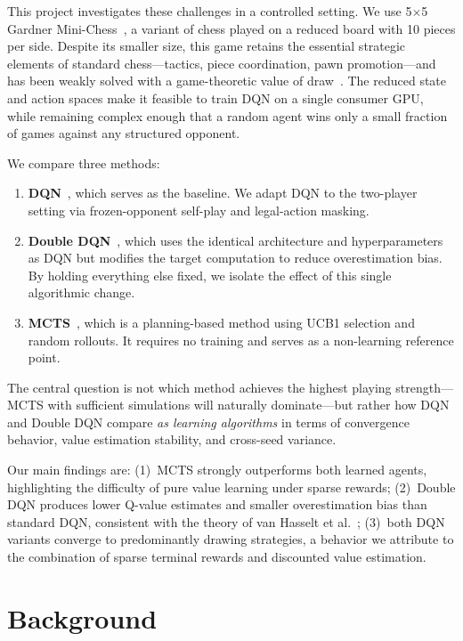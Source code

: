 \documentclass[letterpaper]{article}
\begin{document}
This project investigates these challenges in a controlled setting.
We use 5$\times$5 Gardner Mini-Chess~\cite{gardner1970}, a variant of chess played on a reduced board with 10 pieces per side.
Despite its smaller size, this game retains the essential strategic elements of standard chess---tactics, piece coordination, pawn promotion---and has been weakly solved with a game-theoretic value of draw~\cite{ehsan2012}.
The reduced state and action spaces make it feasible to train DQN on a single consumer GPU, while remaining complex enough that a random agent wins only a small fraction of games against any structured opponent.

We compare three methods:
\begin{enumerate}
    \item \textbf{DQN}~\cite{mnih2015human}, which serves as the baseline. We adapt DQN to the two-player setting via frozen-opponent self-play and legal-action masking.
    \item \textbf{Double DQN}~\cite{van2016deep}, which uses the identical architecture and hyperparameters as DQN but modifies the target computation to reduce overestimation bias. By holding everything else fixed, we isolate the effect of this single algorithmic change.
    \item \textbf{MCTS}~\cite{coulom2006,kocsis2006}, which is a planning-based method using UCB1 selection and random rollouts. It requires no training and serves as a non-learning reference point.
\end{enumerate}

The central question is not which method achieves the highest playing strength---MCTS with sufficient simulations will naturally dominate---but rather how DQN and Double DQN compare \emph{as learning algorithms} in terms of convergence behavior, value estimation stability, and cross-seed variance.

Our main findings are:
(1)~MCTS strongly outperforms both learned agents, highlighting the difficulty of pure value learning under sparse rewards;
(2)~Double DQN produces lower Q-value estimates and smaller overestimation bias than standard DQN, consistent with the theory of van Hasselt et al.~\cite{van2016deep};
(3)~both DQN variants converge to predominantly drawing strategies, a behavior we attribute to the combination of sparse terminal rewards and discounted value estimation.


\section{Background}
\end{document}

